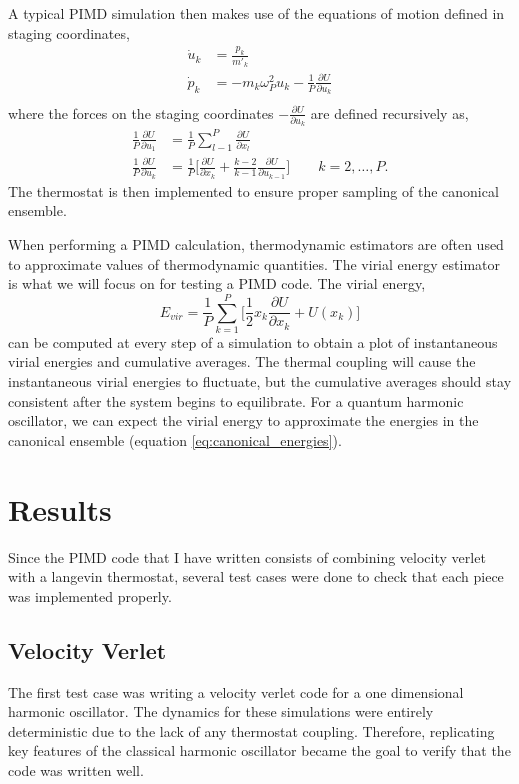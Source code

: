 \documentclass{article}
\newcommand{\be}{\begin{equation}}
\newcommand{\ee}{\end{equation}}
\begin{document}
A typical PIMD simulation then makes use of the equations of motion defined in staging coordinates,
\be
  \begin{split}
    \dot{u}_k &= \frac{p_k}{m'_k} \\
    \dot{p}_k &= - m_k \omega_P^2 u_k - \frac{1}{P} \frac{\partial U}{\partial u_k} \\
  \end{split}
\ee
where the forces on the staging coordinates $- \frac{\partial U}{\partial u_k}$ are defined recursively as,
\be
  \begin{split}
    \frac{1}{P} \frac{\partial U}{\partial u_1} &= \frac{1}{P} \sum_{l-1}^{P} \frac{\partial U}{\partial x_l} \\
    \frac{1}{P} \frac{\partial U}{\partial u_k} &= \frac{1}{P} \Big[ \frac{\partial U}{\partial x_k} + \frac{k-2}{k-1} \frac{\partial U}{\partial u_{k-1}}\Big] \quad \quad k = 2,\dots, P .
  \end{split}
\ee
The thermostat is then implemented to ensure proper sampling of the canonical ensemble.\cite{Liu}

When performing a PIMD calculation, thermodynamic estimators are often used to approximate values of thermodynamic quantities.
The virial energy estimator is what we will focus on for testing a PIMD code.
The virial energy,
\be
  E_{vir} = \frac{1}{P} \sum_{k=1}^P \Big[ \frac{1}{2}x_k \frac{\partial U}{\partial x_k} + U(x_k) \Big]
\ee
can be computed at every step of a simulation to obtain a plot of instantaneous virial energies and cumulative averages.
The thermal coupling will cause the instantaneous virial energies to fluctuate, but the cumulative averages should stay consistent after the system begins to equilibrate.
For a quantum harmonic oscillator, we can expect the virial energy to approximate the energies in the canonical ensemble (equation \ref{eq:canonical_energies}).

\section{Results}
Since the PIMD code that I have written consists of combining velocity verlet with a langevin thermostat, several test cases were done to check that each piece was implemented properly.

\subsection{Velocity Verlet}
The first test case was writing a velocity verlet code for a one dimensional harmonic oscillator.
The dynamics for these simulations were entirely deterministic due to the lack of any thermostat coupling.
Therefore, replicating key features of the classical harmonic oscillator became the goal to verify that the code was written well.
\end{document}
